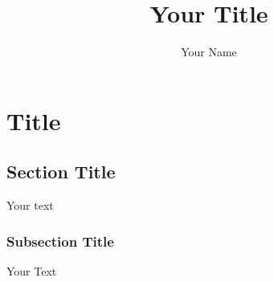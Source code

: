 \documentclass[10pt]{memoir}
\title{Your Title}
\author{Your Name}
\date{}
\begin{document}
\maketitle
\chapter{Title}

\section{Section Title}
Your text

\subsection{Subsection Title}
Your Text
\end{document}
